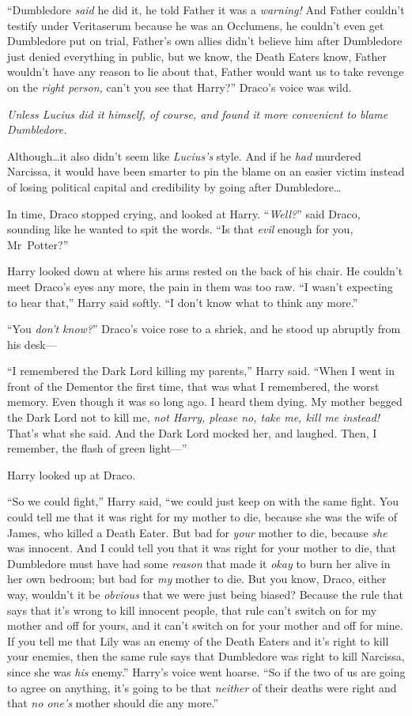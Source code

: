 “Dumbledore \emph{said} he did it, he told Father it was a \emph{warning!} And Father couldn’t testify under Veritaserum because he was an Occlumens, he couldn’t even get Dumbledore put on trial, Father’s own allies didn’t believe him after Dumbledore just denied everything in public, but we know, the Death Eaters know, Father wouldn’t have any reason to lie about that, Father would want us to take revenge on the \emph{right person,} can’t you see that Harry?” Draco’s voice was wild.

\emph{Unless Lucius did it himself, of course, and found it more convenient to blame Dumbledore.}

Although…it also didn’t seem like \emph{Lucius’s} style. And if he \emph{had} murdered Narcissa, it would have been smarter to pin the blame on an easier victim instead of losing political capital and credibility by going after Dumbledore…

In time, Draco stopped crying, and looked at Harry. “\emph{Well?}” said Draco, sounding like he wanted to spit the words. “Is that \emph{evil} enough for you, Mr~Potter?”

Harry looked down at where his arms rested on the back of his chair. He couldn’t meet Draco’s eyes any more, the pain in them was too raw. “I wasn’t expecting to hear that,” Harry said softly. “I don’t know what to think any more.”

“You \emph{don’t know?}” Draco’s voice rose to a shriek, and he stood up abruptly from his desk—

“I remembered the Dark Lord killing my parents,” Harry said. “When I went in front of the Dementor the first time, that was what I remembered, the worst memory. Even though it was so long ago. I heard them dying. My mother begged the Dark Lord not to kill me, \emph{not Harry, please no, take me, kill me instead!} That’s what she said. And the Dark Lord mocked her, and laughed. Then, I remember, the flash of green light—”

Harry looked up at Draco.

“So we could fight,” Harry said, “we could just keep on with the same fight. You could tell me that it was right for my mother to die, because she was the wife of James, who killed a Death Eater. But bad for \emph{your} mother to die, because \emph{she} was innocent. And I could tell you that it was right for your mother to die, that Dumbledore must have had some \emph{reason} that made it \emph{okay} to burn her alive in her own bedroom; but bad for \emph{my} mother to die. But you know, Draco, either way, wouldn’t it be \emph{obvious} that we were just being biased? Because the rule that says that it’s wrong to kill innocent people, that rule can’t switch on for my mother and off for yours, and it can’t switch on for your mother and off for mine. If you tell me that Lily was an enemy of the Death Eaters and it’s right to kill your enemies, then the same rule says that Dumbledore was right to kill Narcissa, since she was \emph{his} enemy.” Harry’s voice went hoarse. “So if the two of us are going to agree on anything, it’s going to be that \emph{neither} of their deaths were right and that \emph{no one’s} mother should die any more.”

